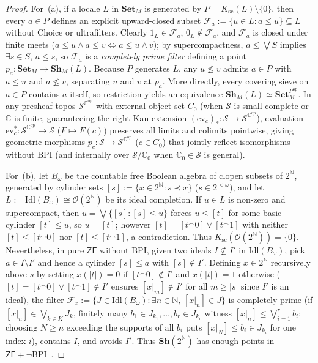 \begin{proof}
For~(a), if a locale $L$ in $\mathbf{Set}_M$ is generated by $P = K_{\mathrm{sc}}(L) \setminus \{0\}$, then every $a \in P$ defines an explicit upward-closed subset $\mathcal{F}_a := \{u \in L : a \le u\} \subseteq L$ without Choice or ultrafilters. Clearly $1_L \in \mathcal{F}_a$, $0_L \notin \mathcal{F}_a$, and $\mathcal{F}_a$ is closed under finite meets ($a \le u \wedge a \le v \iff a \le u \wedge v$); by supercompactness, $a \le \bigvee S$ implies $\exists s \in S,\, a \le s$, so $\mathcal{F}_a$ is a \emph{completely prime filter} defining a point $p_a : \mathbf{Set}_M \to \mathbf{Sh}_M(L)$. Because $P$ generates $L$, any $u \not\le v$ admits $a \in P$ with $a \le u$ and $a \not\le v$, separating $u$ and $v$ at $p_a$. More directly, every covering sieve on $a \in P$ contains $a$ itself, so restriction yields an equivalence $\mathbf{Sh}_M(L) \simeq \mathbf{Set}_M^{P^{\mathrm{op}}}$. In any presheaf topos $\mathcal{S}^{\mathbb{C}^{\mathrm{op}}}$ with external object set $C_0$ (when $\mathcal{S}$ is small-complete or $\mathbb{C}$ is finite, guaranteeing the right Kan extension $(\mathrm{ev}_c)_* : \mathcal{S} \to \mathcal{S}^{\mathbb{C}^{\mathrm{op}}}$), evaluation $\mathrm{ev}_c^* : \mathcal{S}^{\mathbb{C}^{\mathrm{op}}} \to \mathcal{S}$ ($F \mapsto F(c)$) preserves all limits and colimits pointwise, giving geometric morphisms $p_c : \mathcal{S} \to \mathcal{S}^{\mathbb{C}^{\mathrm{op}}}$ ($c \in C_0$) that jointly reflect isomorphisms without $\mathrm{BPI}$ (and internally over $\mathcal{S}/\mathbb{C}_0$ when $\mathbb{C}_0 \in \mathcal{S}$ is general).

For~(b), let $B_\omega$ be the countable free Boolean algebra of clopen subsets of $2^{\mathbb{N}}$, generated by cylinder sets $[s] := \{x \in 2^{\mathbb{N}} : s \prec x\}$ ($s \in 2^{<\omega}$), and let $L := \mathrm{Idl}(B_\omega) \cong \mathcal{O}(2^{\mathbb{N}})$ be its ideal completion. If $u \in L$ is non-zero and supercompact, then $u = \bigvee \{[s] : [s] \le u\}$ forces $u \le [t]$ for some basic cylinder $[t] \le u$, so $u = [t]$; however $[t] = [t^\frown 0] \vee [t^\frown 1]$ with neither $[t] \le [t^\frown 0]$ nor $[t] \le [t^\frown 1]$, a contradiction. Thus $K_{\mathrm{sc}}(\mathcal{O}(2^{\mathbb{N}})) = \{0\}$. Nevertheless, in pure $\mathsf{ZF}$ without $\mathrm{BPI}$, given two ideals $I \not\subseteq I'$ in $\mathrm{Idl}(B_\omega)$, pick $a \in I \setminus I'$ and hence a cylinder $[s] \le a$ with $[s] \notin I'$. Defining $x \in 2^{\mathbb{N}}$ recursively above $s$ by setting $x(|t|) = 0$ if $[t^\frown 0] \notin I'$ and $x(|t|) = 1$ otherwise ($[t] = [t^\frown 0] \vee [t^\frown 1] \notin I'$ ensures $[x|_m] \notin I'$ for all $m \ge |s|$ since $I'$ is an ideal), the filter $\mathcal{F}_x := \{J \in \mathrm{Idl}(B_\omega) : \exists n \in \mathbb{N},\, [x|_n] \in J\}$ is completely prime (if $[x|_n] \in \bigvee_{k \in K} J_k$, finitely many $b_1 \in J_{k_1}, \dots, b_r \in J_{k_r}$ witness $[x|_n] \le \bigvee_{i=1}^r b_i$; choosing $N \ge n$ exceeding the supports of all $b_i$ puts $[x|_N] \le b_i \in J_{k_i}$ for one index $i$), contains $I$, and avoids $I'$. Thus $\mathbf{Sh}(2^{\mathbb{N}})$ has enough points in $\mathsf{ZF} + \neg\mathrm{BPI}$~\cite{Johnstone82}.
\end{proof}

